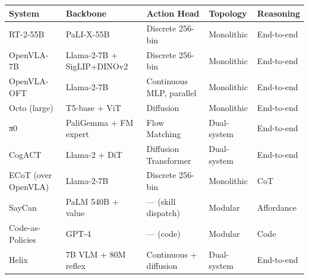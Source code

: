 {\def\LTcaptype{none} %
\begin{longtable}[]{@{}
  >{\raggedright\arraybackslash}p{}
  >{\raggedright\arraybackslash}p{}
  >{\raggedright\arraybackslash}p{}
  >{\raggedright\arraybackslash}p{}
  >{\raggedright\arraybackslash}p{}@{}}
\toprule\noalign{}
\begin{minipage}[b]{\linewidth}\raggedright
System
\end{minipage} & \begin{minipage}[b]{\linewidth}\raggedright
Backbone
\end{minipage} & \begin{minipage}[b]{\linewidth}\raggedright
Action Head
\end{minipage} & \begin{minipage}[b]{\linewidth}\raggedright
Topology
\end{minipage} & \begin{minipage}[b]{\linewidth}\raggedright
Reasoning
\end{minipage} \\
\midrule\noalign{}
\endhead
\bottomrule\noalign{}
\endlastfoot
RT-2-55B & PaLI-X-55B & Discrete 256-bin & Monolithic & End-to-end \\
OpenVLA-7B & Llama-2-7B + SigLIP+DINOv2 & Discrete 256-bin & Monolithic & End-to-end \\
OpenVLA-OFT & Llama-2-7B & Continuous MLP, parallel & Monolithic & End-to-end \\
Octo (large) & T5-base + ViT & Diffusion & Monolithic & End-to-end \\
π0 & PaliGemma + FM expert & Flow Matching & Dual-system & End-to-end \\
CogACT & Llama-2 + DiT & Diffusion Transformer & Dual-system & End-to-end \\
ECoT (over OpenVLA) & Llama-2-7B & Discrete 256-bin & Monolithic & CoT \\
SayCan & PaLM 540B + value & --- (skill dispatch) & Modular & Affordance \\
Code-as-Policies & GPT-4 & --- (code) & Modular & Code \\
Helix & 7B VLM + 80M reflex & Continuous + diffusion & Dual-system & End-to-end \\
\end{longtable}
}

